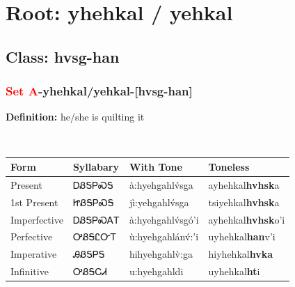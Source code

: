 \needspace{4in}
\section*{Root: yhehkal / yehkal}
\nopagebreak
{}
\needspace{3in}
\subsection*{Class: hvsg-han}
\nopagebreak
\needspace{2in}
\subsubsection*{\textcolor{Red}{Set A}{-}\textbf{yhehkal/yehkal}{-}[hvsg-han]}
\nopagebreak
\textbf{Definition: } he/she is quilting it
\\[0.5em]
\begin{tabularx}{\textwidth}{l X X X}%
\toprule%
\textbf{Form}&\textbf{Syllabary}&\textbf{With Tone}&\textbf{Toneless}\\%
\midrule%
Present&ᎠᏰᎦᏢᏍᎦ&à:hyehgahlv́sga&ayhehkal\textbf{hvhsk}a\\%
1st Present&ᏥᏰᎦᏢᏍᎦ&jì:yehgahlv́sga&tsiyehkal\textbf{hvhsk}a\\%
Imperfective&ᎠᏰᎦᏢᏍᎪᎢ&à:hyehgahlv́sgó’i&ayhehkal\textbf{hvhsk}o'i\\%
Perfective&ᎤᏰᎦᏝᏅᎢ&ù:hyehgahlánv́:’i&uyhehkal\textbf{han}v'i\\%
Imperative&ᎯᏰᎦᏢᎦ&hihyehgahlv̀:ga&hiyhehkal\textbf{hvka}\\%
Infinitive&ᎤᏰᎦᏟᏗ&u:hyehgahldi&uyhehkal\textbf{ht}i\\%
\bottomrule%
\end{tabularx}
\\[1em]